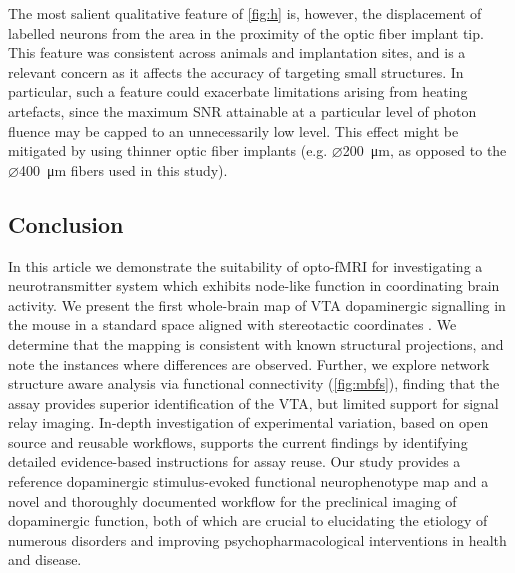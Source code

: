 The most salient qualitative feature of \cref{fig:h} is, however, the displacement of labelled neurons from the area in the proximity of the optic fiber implant tip.
This feature was consistent across animals and implantation sites, and is a relevant concern as it affects the accuracy of targeting small structures.
In particular, such a feature could exacerbate limitations arising from heating artefacts, since the maximum SNR attainable at a particular level of photon fluence may be capped to an unnecessarily low level.
This effect might be mitigated by using thinner optic fiber implants (e.g. $\diameter$\SI{200}{\micro\meter}, as opposed to the $\diameter$\SI{400}{\micro\meter} fibers used in this study).

\subsection{Conclusion}

In this article we demonstrate the suitability of opto-fMRI for investigating a neurotransmitter system which exhibits node-like function in coordinating brain activity.
We present the first whole-brain map of VTA dopaminergic signalling in the mouse in a standard space aligned with stereotactic coordinates \cite{me}.
We determine that the mapping is consistent with known structural projections, and note the instances where differences are observed.
Further, we explore network structure aware analysis via functional connectivity (\cref{fig:mbfs}), finding that the assay provides superior identification of the VTA, but limited support for signal relay imaging.
In-depth investigation of experimental variation, based on open source and reusable workflows, supports the current findings by identifying detailed evidence-based instructions for assay reuse.
Our study provides a reference dopaminergic stimulus-evoked functional neurophenotype map and a novel and thoroughly documented workflow for the preclinical imaging of dopaminergic function, both of which are crucial to elucidating the etiology of numerous disorders and improving psychopharmacological interventions in health and disease.
